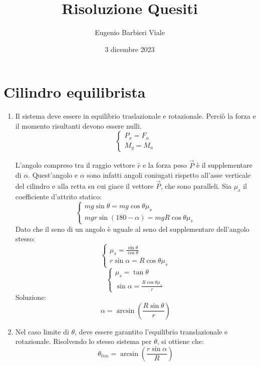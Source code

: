 \documentclass[]{article}
\title{Risoluzione Quesiti}
\author{Eugenio Barbieri Viale}
\date{3 dicembre 2023}
\begin{document}
\maketitle

\section{Cilindro equilibrista}
\begin{enumerate}
	\item Il sistema deve essere in equilibrio traslazionale e rotazionale. Perciò la forza e il momento risultanti devono
		essere nulli. 
		\begin{equation}	
			\begin{cases}
				P_x=F_a\\
				M_g=M_a
			\end{cases}
		\end{equation}	

		L'angolo compreso tra il raggio vettore $\hat{r}$ e la forza peso $\vec{P}$ è il supplementare di $\alpha$. Quest'angolo e $\alpha$ sono infatti angoli coniugati rispetto all'asse verticale del cilindro e alla retta su cui giace il vettore $\vec{P}$, che sono paralleli. Sia $\mu_s$ il coefficiente d'attrito statico:
		\begin{equation}	
			\begin{cases}
				mg\sin{\theta}=mg\cos{\theta}\mu_s\\
				mgr\sin({180-\alpha})=mgR\cos{\theta}\mu_s
			\end{cases}
		\end{equation}	
		Dato che il seno di un angolo è uguale al seno del supplementare dell'angolo stesso:
		\begin{equation}	
			\begin{cases}
				\mu_s=\frac{\sin{\theta}}{{\cos{\theta}}}\\
				r\sin{\alpha}=R\cos{\theta}\mu_s
			\end{cases}
		\end{equation}	
		\begin{equation}	
			\begin{cases}
				\mu_s=\tan{\theta}\\
				\sin{\alpha}=\frac{R\cos{\theta}\mu_s}{r}
			\end{cases}
		\end{equation}	
		Soluzione:
		$$\alpha=\arcsin\left({\frac{R\sin{\theta}}{r}}\right)$$

	\item Nel caso limite di $\theta$, deve essere garantito l'equilibrio translazionale e rotazionale. Risolvendo lo stesso sistema per $\theta$, si ottiene che:
		$$\theta_{lim}=\arcsin\left({\frac{r\sin{\alpha}}{R}}\right)$$
\end{enumerate}
\end{document}
